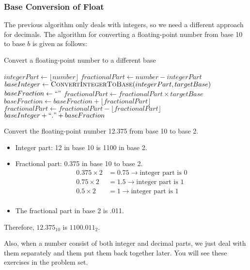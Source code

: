     \subsubsection*{Base Conversion of Float}
    The previous algorithm only deals with integers, so we need a different approach for decimals.
    The algorithm for converting a floating-point number from base 10 to base $b$ is given as follows:

\begin{algorithm}
\caption{Convert a floating-point number to a different base}
\begin{algorithmic}[1]
    \State $integerPart \gets \lfloor number \rfloor$
    \State $fractionalPart \gets number - integerPart$
    \State $baseInteger \gets \Call{ConvertIntegerToBase}{integerPart, targetBase}$
    \State $baseFraction \gets ``"$
        \State $fractionalPart \gets fractionalPart \times targetBase$
        \State $baseFraction \gets baseFraction + \lfloor fractionalPart \rfloor$
        \State $fractionalPart \gets fractionalPart - \lfloor fractionalPart \rfloor$
    \EndWhile
    \State \Return $baseInteger + ``." + baseFraction$
\EndFunction
\end{algorithmic}
\end{algorithm}

\begin{example}
Convert the floating-point number 12.375 from base 10 to base 2.
\begin{itemize}
\item Integer part: 12 in base 10 is 1100 in base 2.
\item Fractional part: 0.375 in base 10 to base 2.
\begin{align*}
0.375 \times 2 &= 0.75 \rightarrow \text{integer part is 0} \\
0.75 \times 2 &= 1.5 \rightarrow \text{integer part is 1} \\
0.5 \times 2 &= 1 \rightarrow \text{integer part is 1} \\
\end{align*}
\item The fractional part in base 2 is .011.
\end{itemize}

Therefore, $12.375_{10}$ is $1100.011_{2}$.
\end{example}
Also, when a number consist of both integer and decimal parts, we just deal with them separately
and them put them back together later. You will see these exercises in the problem set.

